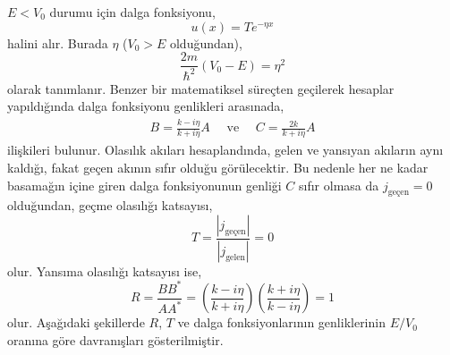 \documentclass[a4paper,12pt, twoside]{article}
\begin{document}
$E<V_0$ durumu için dalga fonksiyonu,
\begin{equation}
u ( x ) = T e ^ { - \eta x }
\end{equation}
halini alır. Burada $\eta$ ($V_0>E$ olduğundan),
\begin{equation}
\frac { 2 m} { \hbar ^ { 2 } }  \left(V _ { 0 } -E \right) = \eta ^ { 2 }
\end{equation}
olarak tanımlanır. Benzer bir matematiksel süreçten geçilerek hesaplar yapıldığında dalga fonksiyonu genlikleri arasınada,
\begin{align}
B =  \frac{k - i \eta}{k + i \eta} A \quad \text{ ve } \quad C =  \frac{2k}{ k+i \eta} A
\end{align}
ilişkileri bulunur. Olasılık akıları hesaplandında, gelen ve yansıyan akıların aynı kaldığı, fakat geçen akının sıfır olduğu görülecektir. Bu nedenle her ne kadar basamağın içine giren dalga fonksiyonunun genliği $C$ sıfır olmasa da $j_\text{geçen} = 0$ olduğundan, geçme olasılığı katsayısı,
\begin{equation}
T = \frac{|j_\text{geçen}|}{|j_\text{gelen}|} = 0
\end{equation}
olur. Yansıma olasılığı katsayısı ise,
\begin{equation}
R = \frac{B B^*}{A A^*} = \left(  \frac{k - i \eta}{k + i \eta} \right) \left( \frac{k + i \eta}{k - i \eta} \right)  = 1
\end{equation}
olur. Aşağıdaki şekillerde $R$, $T$ ve dalga fonksiyonlarının genliklerinin $E/V_0$ oranına göre davranışları gösterilmiştir.
\end{document}
